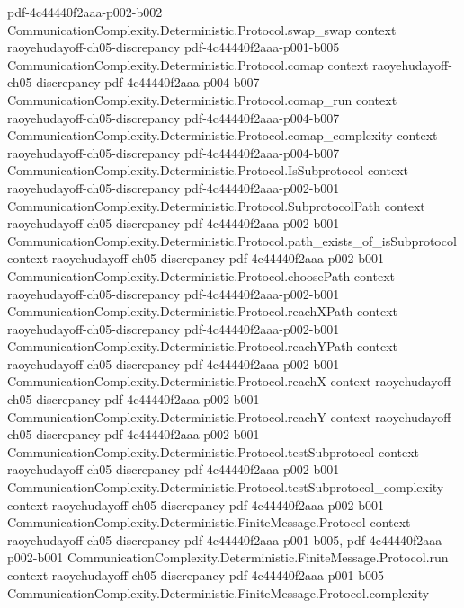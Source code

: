 \begin{theorem}
  {pdf-4c44440f2aaa-p002-b002}
\proofstep
  {CommunicationComplexity.Deterministic.Protocol.swap_swap}
  {context}
  {raoyehudayoff-ch05-discrepancy}
  {pdf-4c44440f2aaa-p001-b005}
\proofstep
  {CommunicationComplexity.Deterministic.Protocol.comap}
  {context}
  {raoyehudayoff-ch05-discrepancy}
  {pdf-4c44440f2aaa-p004-b007}
\proofstep
  {CommunicationComplexity.Deterministic.Protocol.comap_run}
  {context}
  {raoyehudayoff-ch05-discrepancy}
  {pdf-4c44440f2aaa-p004-b007}
\proofstep
  {CommunicationComplexity.Deterministic.Protocol.comap_complexity}
  {context}
  {raoyehudayoff-ch05-discrepancy}
  {pdf-4c44440f2aaa-p004-b007}
\proofstep
  {CommunicationComplexity.Deterministic.Protocol.IsSubprotocol}
  {context}
  {raoyehudayoff-ch05-discrepancy}
  {pdf-4c44440f2aaa-p002-b001}
\proofstep
  {CommunicationComplexity.Deterministic.Protocol.SubprotocolPath}
  {context}
  {raoyehudayoff-ch05-discrepancy}
  {pdf-4c44440f2aaa-p002-b001}
\proofstep
  {CommunicationComplexity.Deterministic.Protocol.path_exists_of_isSubprotocol}
  {context}
  {raoyehudayoff-ch05-discrepancy}
  {pdf-4c44440f2aaa-p002-b001}
\proofstep
  {CommunicationComplexity.Deterministic.Protocol.choosePath}
  {context}
  {raoyehudayoff-ch05-discrepancy}
  {pdf-4c44440f2aaa-p002-b001}
\proofstep
  {CommunicationComplexity.Deterministic.Protocol.reachXPath}
  {context}
  {raoyehudayoff-ch05-discrepancy}
  {pdf-4c44440f2aaa-p002-b001}
\proofstep
  {CommunicationComplexity.Deterministic.Protocol.reachYPath}
  {context}
  {raoyehudayoff-ch05-discrepancy}
  {pdf-4c44440f2aaa-p002-b001}
\proofstep
  {CommunicationComplexity.Deterministic.Protocol.reachX}
  {context}
  {raoyehudayoff-ch05-discrepancy}
  {pdf-4c44440f2aaa-p002-b001}
\proofstep
  {CommunicationComplexity.Deterministic.Protocol.reachY}
  {context}
  {raoyehudayoff-ch05-discrepancy}
  {pdf-4c44440f2aaa-p002-b001}
\proofstep
  {CommunicationComplexity.Deterministic.Protocol.testSubprotocol}
  {context}
  {raoyehudayoff-ch05-discrepancy}
  {pdf-4c44440f2aaa-p002-b001}
\proofstep
  {CommunicationComplexity.Deterministic.Protocol.testSubprotocol_complexity}
  {context}
  {raoyehudayoff-ch05-discrepancy}
  {pdf-4c44440f2aaa-p002-b001}
\proofstep
  {CommunicationComplexity.Deterministic.FiniteMessage.Protocol}
  {context}
  {raoyehudayoff-ch05-discrepancy}
  {pdf-4c44440f2aaa-p001-b005,
    pdf-4c44440f2aaa-p002-b001}
\proofstep
  {CommunicationComplexity.Deterministic.FiniteMessage.Protocol.run}
  {context}
  {raoyehudayoff-ch05-discrepancy}
  {pdf-4c44440f2aaa-p001-b005}
\proofstep
  {CommunicationComplexity.Deterministic.FiniteMessage.Protocol.complexity}

\end{theorem}
